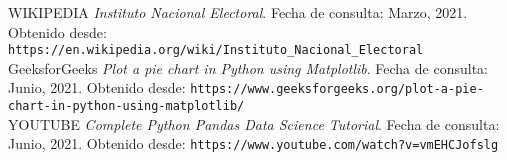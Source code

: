 \documentclass[%
 reprint,
 amsmath,amssymb,
 aps,
]{revtex4-2}
\begin{document}
\begin{thebibliography}{}

WIKIPEDIA \textit{Instituto Nacional Electoral}. Fecha de consulta: Marzo, 2021. Obtenido desde: \texttt{https://en.wikipedia.org/wiki/Instituto_Nacional_Electoral}\\

GeeksforGeeks \textit{Plot a pie chart in Python using Matplotlib}. Fecha de consulta: Junio, 2021. Obtenido desde: \texttt{https://www.geeksforgeeks.org/plot-a-pie-chart-in-python-using-matplotlib/}\\


YOUTUBE \textit{Complete Python Pandas Data Science Tutorial}. Fecha de consulta: Junio, 2021. Obtenido desde: \texttt{https://www.youtube.com/watch?v=vmEHCJofslg}\\


\end{thebibliography}
\end{document}
